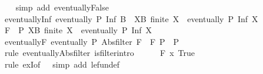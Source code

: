 \begin{isabellebody}
%
\isadelimproof
\ \ %
\endisadelimproof
%
\isatagproof
{}\isamarkupfalse%
\ {\isacharparenleft}{\kern0pt}simp\ add{\isacharcolon}{\kern0pt}\ eventually{\isacharunderscore}{\kern0pt}False{\isacharparenright}{\kern0pt}%
\endisatagproof
{\isafoldproof}%
%
\isadelimproof
\isanewline
%
\endisadelimproof
\isanewline
{}\isamarkupfalse%
\ eventually{\isacharunderscore}{\kern0pt}Inf{\isacharcolon}{\kern0pt}\ {\isachardoublequoteopen}eventually\ P\ {\isacharparenleft}{\kern0pt}Inf\ B{\isacharparenright}{\kern0pt}\ {\isasymlongleftrightarrow}\ {\isacharparenleft}{\kern0pt}{\isasymexists}X{\isasymsubseteq}B{\isachardot}{\kern0pt}\ finite\ X\ {\isasymand}\ eventually\ P\ {\isacharparenleft}{\kern0pt}Inf\ X{\isacharparenright}{\kern0pt}{\isacharparenright}{\kern0pt}{\isachardoublequoteclose}\isanewline
%
\isadelimproof
%
\endisadelimproof
%
\isatagproof
{}\isamarkupfalse%
\ {\isacharminus}{\kern0pt}\isanewline
\ \ \isamarkupfalse%
\ {\isacharquery}{\kern0pt}F\ {\isacharequal}{\kern0pt}\ {\isachardoublequoteopen}{\isasymlambda}P{\isachardot}{\kern0pt}\ {\isasymexists}X{\isasymsubseteq}B{\isachardot}{\kern0pt}\ finite\ X\ {\isasymand}\ eventually\ P\ {\isacharparenleft}{\kern0pt}Inf\ X{\isacharparenright}{\kern0pt}{\isachardoublequoteclose}\isanewline
\isanewline
\ \ \isamarkupfalse%
\ eventually{\isacharunderscore}{\kern0pt}F{\isacharcolon}{\kern0pt}\ {\isachardoublequoteopen}eventually\ P\ {\isacharparenleft}{\kern0pt}Abs{\isacharunderscore}{\kern0pt}filter\ {\isacharquery}{\kern0pt}F{\isacharparenright}{\kern0pt}\ {\isasymlongleftrightarrow}\ {\isacharquery}{\kern0pt}F\ P{\isachardoublequoteclose}\ \ P\isanewline
\ \ \isamarkupfalse%
\ {\isacharparenleft}{\kern0pt}rule\ eventually{\isacharunderscore}{\kern0pt}Abs{\isacharunderscore}{\kern0pt}filter\ is{\isacharunderscore}{\kern0pt}filter{\isachardot}{\kern0pt}intro{\isacharparenright}{\kern0pt}{\isacharplus}{\kern0pt}\isanewline
\ \ \ \ \isamarkupfalse%
\ {\isachardoublequoteopen}{\isacharquery}{\kern0pt}F\ {\isacharparenleft}{\kern0pt}{\isasymlambda}x{\isachardot}{\kern0pt}\ True{\isacharparenright}{\kern0pt}{\isachardoublequoteclose}\isanewline
\ \ \ \ \ \ \isamarkupfalse%
\ {\isacharparenleft}{\kern0pt}rule\ exI{\isacharbrackleft}{\kern0pt}of\ {\isacharunderscore}{\kern0pt}\ {\isachardoublequoteopen}{\isacharbraceleft}{\kern0pt}{\isacharbraceright}{\kern0pt}{\isachardoublequoteclose}{\isacharbrackright}{\kern0pt}{\isacharparenright}{\kern0pt}\ {\isacharparenleft}{\kern0pt}simp\ add{\isacharcolon}{\kern0pt}\ le{\isacharunderscore}{\kern0pt}fun{\isacharunderscore}{\kern0pt}def{\isacharparenright}{\kern0pt}\isanewline

\end{isabellebody}
